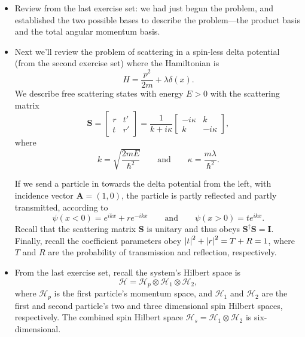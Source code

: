 \documentclass[11pt, a4paper]{article}
\newcommand{\eqtext}[1]{\qquad \text{#1} \qquad}
\renewcommand{\vec}[1]{\bm{#1}} %
\newcommand{\mat}[1]{\mathbf{#1}} %
\renewcommand{\H}{\mathcal{H}}  %
\begin{document}
\begin{itemize}
	\item Review from the last exercise set: we had just begun the problem, and established the two possible bases to describe the problem---the product basis and the total angular momentum basis.
	
	\item Next we'll review the problem of scattering in a spin-less delta potential (from the second exercise set) where the Hamiltonian is
	\begin{equation*}
		H = \frac{p^{2}}{2m} + \lambda \delta (x).
	\end{equation*}
	We describe free scattering states with energy $ E > 0 $ with the scattering matrix
	\begin{equation*}
		\mat{S} = 
		\begin{bmatrix}
			r & t'\\
			t & r'
		\end{bmatrix}
		 = 
		 \frac{1}{k + i \kappa}
		 \begin{bmatrix}
		 	- i\kappa & k\\
		 	k	& - i\kappa
		 \end{bmatrix},
	\end{equation*}
	where 
	\begin{equation*}
		k = \sqrt{\frac{2mE}{\hbar^{2}}} \eqtext{and} \kappa = \frac{m\lambda}{\hbar^{2}}.
	\end{equation*}
	
	
	If we send a particle in towards the delta potential from the left, with incidence vector $ \vec{A} = (1, 0) $, the particle is partly reflected and partly transmitted, according to
	\begin{equation*}
		\psi(x < 0) = e^{ikx} + re^{-ikx} \eqtext{and} \psi(x>0) = te^{ikx}.
	\end{equation*}
	Recall that the scattering matrix $ \mat{S} $ is unitary and thus obeys $ \mat{S}^{\dagger}\mat{S} = \mat{I} $. Finally, recall the coefficient parameters obey $ \abs{t}^{2} + \abs{r}^{2} = T + R = 1 $, where $ T $ and $ R $ are the probability of transmission and reflection, respectively.
	
	\item From the last exercise set, recall the system's Hilbert space is
	\begin{equation*}
		\H = \H_{p} \otimes \H_{1} \otimes \H_{2},
	\end{equation*}
	where $ \H_{p} $ is the first particle's momentum space, and $ \H_{1} $ and $ \H_{2} $ are the first and second particle's two and three dimensional spin Hilbert spaces, respectively. The combined spin Hilbert space $ \H_{s} = \H_{1} \otimes \H_{2} $ is six-dimensional.
	

\end{itemize}
\end{document}
